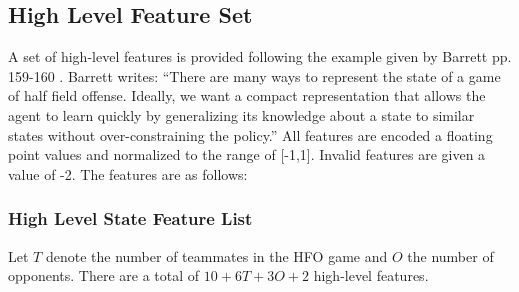 \documentclass[12pt]{article}
\begin{document}
\subsection{High Level Feature Set}
A set of high-level features is provided following the example given
by Barrett pp. 159-160 \cite{THESIS14-Barrett}. Barrett writes:
``There are many ways to represent the state of a game of half field
offense.  Ideally, we want a compact representation that allows the
agent to learn quickly by generalizing its knowledge about a state to
similar states without over-constraining the policy.'' All features
are encoded a floating point values and normalized to the range of
[-1,1]. Invalid features are given a value of -2. The features are as
follows:

\subsubsection{High Level State Feature List}
Let $T$ denote the number of teammates in the HFO game and $O$ the
number of opponents. There are a total of $10 + 6T + 3O + 2$ high-level
features.
\end{document}
